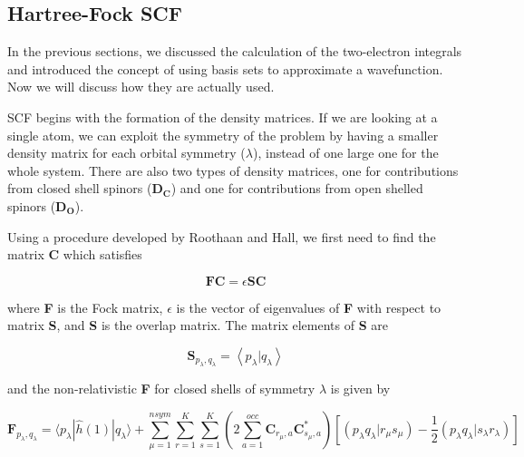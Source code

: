 \documentclass[12pt]{report}
\begin{document}
\subsection{Hartree-Fock SCF}
In the previous sections, we discussed the calculation of the two-electron integrals and introduced the concept of using basis sets to approximate a wavefunction. Now we will discuss how they are actually used. 

SCF begins with the formation of the density matrices. If we are looking at a single atom, we can exploit the symmetry of the problem by having a smaller density matrix for each orbital symmetry ($\lambda$), instead of one large one for the whole system. There are also two types of density matrices, one for contributions from closed shell spinors (\textbf{D$_\textbf{C}$}) and one for contributions from open shelled spinors (\textbf{D$_\textbf{O}$}).

Using a procedure developed by Roothaan and Hall\cite{RHF, Hall541}, we first need to find the matrix \textbf{C} which satisfies 

\begin{equation}
\label{RHE}
\textbf{FC} = \epsilon{}\textbf{SC}
\end{equation}

where \textbf{F} is the Fock matrix, $\epsilon$ is the vector of eigenvalues of \textbf{F} with respect to matrix \textbf{S}, and \textbf{S} is the overlap matrix. The matrix elements of \textbf{S} are

\begin{equation}
\label{eq:smat}
\textbf{S}_{p_{\lambda}, q_{\lambda}} = \left<p_{\lambda}|q_{\lambda}\right>
\end{equation}

and the non-relativistic \textbf{F} for closed shells of symmetry $\lambda$ is given by

\begin{equation}
\label{FOCKM}
\textbf{F}_{p_{\lambda},q_{\lambda}} = \langle p_{\lambda}|\hat{h}(1)|q_{\lambda}\rangle + \sum^{nsym}_{\mu=1}\sum^{K}_{r=1}\sum^{K}_{s=1}\left( 2\sum^{occ}_{a=1}\textbf{C}_{r_{\mu},a}\textbf{C}^{*}_{s_{\mu}, a}\right)
				\left[\left( p_{\lambda}q_{\lambda}|r_{\mu}s_{\mu}\right) - \frac{1}{2}\left( p_{\lambda}q_{\lambda}|s_{\lambda}r_{\lambda}\right)\right]
\end{equation}
\end{document}
